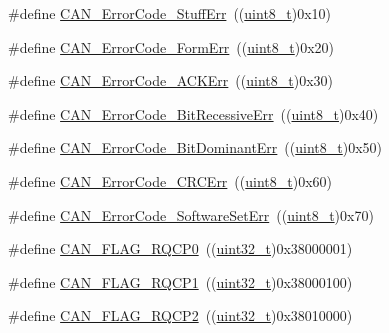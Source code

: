 \begin{DoxyCompactItemize}
\#define \hyperlink{group___c_a_n___error___code__constants_gaa733d1c078472912c3bf60fbdc53734d}{C\+A\+N\+\_\+\+Error\+Code\+\_\+\+Stuff\+Err}~((\hyperlink{_p_e___types_8h_aba7bc1797add20fe3efdf37ced1182c5}{uint8\+\_\+t})0x10)
\item 
\#define \hyperlink{group___c_a_n___error___code__constants_ga1fe585558bb8d5c834b4266661392cb2}{C\+A\+N\+\_\+\+Error\+Code\+\_\+\+Form\+Err}~((\hyperlink{_p_e___types_8h_aba7bc1797add20fe3efdf37ced1182c5}{uint8\+\_\+t})0x20)
\item 
\#define \hyperlink{group___c_a_n___error___code__constants_gad47e6af0116d1b6de85e29286c0b8607}{C\+A\+N\+\_\+\+Error\+Code\+\_\+\+A\+C\+K\+Err}~((\hyperlink{_p_e___types_8h_aba7bc1797add20fe3efdf37ced1182c5}{uint8\+\_\+t})0x30)
\item 
\#define \hyperlink{group___c_a_n___error___code__constants_gaf800de7683f1d22194e1df8eb3b1c5bb}{C\+A\+N\+\_\+\+Error\+Code\+\_\+\+Bit\+Recessive\+Err}~((\hyperlink{_p_e___types_8h_aba7bc1797add20fe3efdf37ced1182c5}{uint8\+\_\+t})0x40)
\item 
\#define \hyperlink{group___c_a_n___error___code__constants_gaa19708aa85d1a34f8f7f25a2bfe88b19}{C\+A\+N\+\_\+\+Error\+Code\+\_\+\+Bit\+Dominant\+Err}~((\hyperlink{_p_e___types_8h_aba7bc1797add20fe3efdf37ced1182c5}{uint8\+\_\+t})0x50)
\item 
\#define \hyperlink{group___c_a_n___error___code__constants_gafa75157442dba7ba1a91036242b78e92}{C\+A\+N\+\_\+\+Error\+Code\+\_\+\+C\+R\+C\+Err}~((\hyperlink{_p_e___types_8h_aba7bc1797add20fe3efdf37ced1182c5}{uint8\+\_\+t})0x60)
\item 
\#define \hyperlink{group___c_a_n___error___code__constants_ga927089dd74347b9fea7a7c59f3840a7c}{C\+A\+N\+\_\+\+Error\+Code\+\_\+\+Software\+Set\+Err}~((\hyperlink{_p_e___types_8h_aba7bc1797add20fe3efdf37ced1182c5}{uint8\+\_\+t})0x70)
\item 
\#define \hyperlink{group___c_a_n__flags_ga6df0579049eb471720ea103c5446298b}{C\+A\+N\+\_\+\+F\+L\+A\+G\+\_\+\+R\+Q\+C\+P0}~((\hyperlink{_p_e___types_8h_a33594304e786b158f3fb30289278f5af}{uint32\+\_\+t})0x38000001)
\item 
\#define \hyperlink{group___c_a_n__flags_gaba705586ebc3d961507436c03a2feaba}{C\+A\+N\+\_\+\+F\+L\+A\+G\+\_\+\+R\+Q\+C\+P1}~((\hyperlink{_p_e___types_8h_a33594304e786b158f3fb30289278f5af}{uint32\+\_\+t})0x38000100)
\item 
\#define \hyperlink{group___c_a_n__flags_ga9c20cd47e558135bd7ae71149583d487}{C\+A\+N\+\_\+\+F\+L\+A\+G\+\_\+\+R\+Q\+C\+P2}~((\hyperlink{_p_e___types_8h_a33594304e786b158f3fb30289278f5af}{uint32\+\_\+t})0x38010000)

\end{DoxyCompactItemize}

